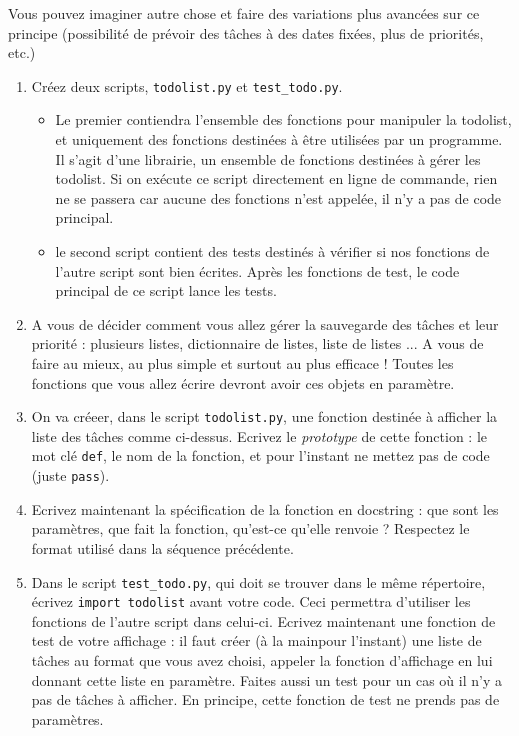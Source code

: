 \documentclass[11pt,a4paper]{article}
\newcommand{\checkbox}{$\square$ \smallskip}
\newcounter{exo} \setcounter{exo}{0}
\newenvironment{action}{%
    \begin{enumerate}[\numerotation] \addtocounter{exo}{-1}%
        }{%
    \end{enumerate}
}
\newcommand{\numexoa}{\theexo \addtocounter{exo}{1}}
\newcommand{\numerotation}{\checkbox \smallskip \numexoa.}
\begin{document}
Vous pouvez imaginer autre chose et faire des variations plus avancées sur ce
principe (possibilité de prévoir des tâches à des dates fixées, plus de
priorités, etc.)

\begin{action}
\item Créez deux scripts, {\tt todolist.py} et {\tt test\_todo.py}.
  \begin{itemize}
  \item Le premier contiendra l'ensemble des fonctions pour manipuler la
    todolist, et uniquement des fonctions destinées à être utilisées par un
    programme. Il s'agit d'une librairie, un
    ensemble de fonctions destinées à gérer les todolist. Si on exécute ce
    script directement en ligne de commande, rien ne se passera car aucune des
    fonctions
    n'est appelée, il n'y a pas de code principal.
  \item le second script contient des tests destinés à vérifier si nos
    fonctions de l'autre script sont bien écrites. Après les
    fonctions de test, le code principal de ce script lance les tests.
  \end{itemize} 
\item A vous de décider comment vous allez gérer la sauvegarde des tâches et
  leur priorité : plusieurs listes, dictionnaire de listes, liste de listes ... A
  vous de faire au mieux, au plus simple et surtout au plus efficace !
  Toutes les fonctions que vous allez écrire devront
  avoir ces objets en paramètre.


\item  On va créeer, dans le script {\tt todolist.py}, une fonction destinée à
  afficher la liste des tâches comme ci-dessus. Ecrivez le {\it prototype} de
  cette fonction : le mot clé {\tt def}, le nom de la fonction, et pour
  l'instant
  ne mettez pas de code (juste {\tt pass}).

\item Ecrivez maintenant la spécification de la fonction en docstring : que
  sont les paramètres, que fait la fonction, qu'est-ce qu'elle renvoie ?
  Respectez     le format utilisé dans la séquence précédente.

\item Dans le script {\tt test\_todo.py}, qui doit se trouver dans le même
  répertoire, écrivez {\tt import todolist} avant votre code. Ceci permettra
  d'utiliser les fonctions de l'autre script dans celui-ci. Ecrivez
  maintenant une fonction de test de votre affichage : il faut
  créer (\og à la main\fg pour l'instant) une liste de tâches au format
  que vous avez choisi, appeler la fonction d'affichage en lui donnant
  cette liste en paramètre. Faites aussi un test pour un cas où il n'y a pas
  de tâches à afficher. En principe, cette fonction de test ne prends pas de
  paramètres.


\end{action}
\end{document}
